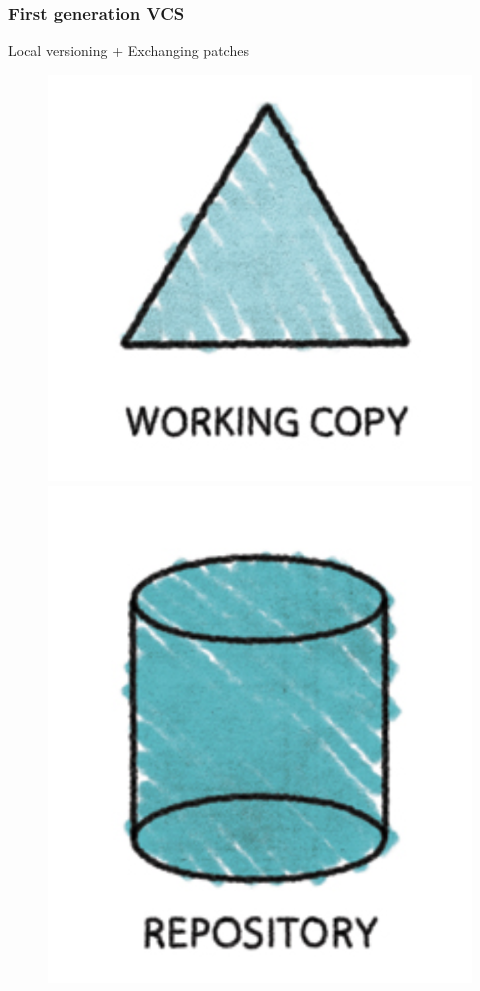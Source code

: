 \documentclass{beamer}
\begin{document}
\begin{frame}
\frametitle{First generation VCS}
Local versioning + Exchanging patches

\begin{figure}

\includegraphics[scale=0.3]{figures/f4.png}
\includegraphics[scale=0.3]{figures/f3.png}
\end{figure}

\end{frame}
\end{document}
